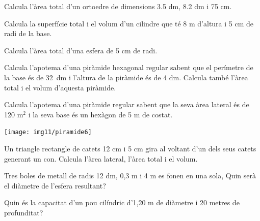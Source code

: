 \begin{activitats}
\begin{mylist}
\exer  Calcula l'àrea total d'un ortoedre de dimensions 3.5 dm, 8.2 dm i 75 cm.


\exer  Calcula la superfície total i el volum d'un cilindre que té 8 m d'altura i 5 cm de radi de la base.


\exer  Calcula l'àrea total d'una esfera de 5 cm de radi.


\exer  Calcula l'apotema d'una piràmide hexagonal regular sabent que el perímetre de la base és de 32~dm i l'altura de la piràmide és de 4 dm. Calcula també l'àrea total i el volum d'aquesta piràmide.


\exer[1]  Calcula l'apotema d'una piràmide regular sabent que la seva àrea lateral és de 120 m${}^{2}$ i la seva base és un hexàgon de 5 m de costat.

\begin{center}
	\texttt{[image: img11/piramide6]}
\end{center}


\exer  Un triangle rectangle de catets 12 cm i 5 cm gira al voltant d'un dels seus catets generant un con. Calcula l'àrea lateral, l'àrea total i el volum.


\exer  Tres boles de metall de radis 12 dm, 0,3 m i 4 m es fonen en una sola, Quin serà el diàmetre de l'esfera resultant?


\exer  Quin és la capacitat d'un pou cilíndric d'1,20 m de diàmetre i 20 metres de profunditat?


\end{mylist}
\end{activitats}
